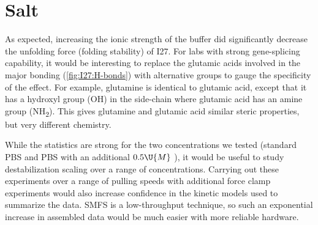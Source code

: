 \section{Salt}
\label{sec:future:salt}

As expected\citep{chauhan97,itkin11,zidar11}, increasing the ionic
strength of the buffer did significantly decrease the unfolding force
(folding stability) of I27.  For labs with strong gene-splicing
capability, it would be interesting to replace the glutamic acids
involved in the major bonding (\cref{fig:I27:H-bonds}) with
alternative groups to gauge the specificity of the effect.  For
example, glutamine is identical to glutamic acid, except that it has a
hydroxyl group (OH) in the side-chain where glutamic acid has an
amine group (NH\textsubscript{2}).  This gives glutamine and glutamic
acid similar steric properties, but very different chemistry.

While the statistics are strong for the two concentrations we tested
(standard PBS and PBS with an additional $0.5\U{M}$ \CaCl), it would
be useful to study destabilization scaling over a range of
concentrations.  Carrying out these experiments over a range of
pulling speeds with additional force clamp experiments would also
increase confidence in the kinetic models used to summarize the data.
SMFS is a low-throughput technique, so such an exponential increase in
assembled data would be much easier with more reliable hardware.
